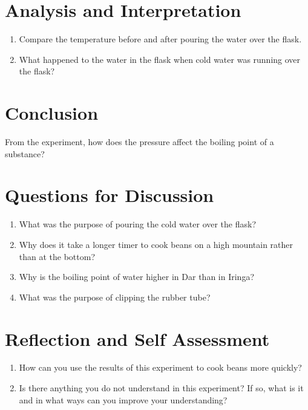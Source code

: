
\section{Analysis and Interpretation}
\begin{enumerate}
\item Compare the temperature before and after pouring the water over the flask.
\item What happened to the water in the flask when cold water was running over the flask?
\end{enumerate}

\section{Conclusion}
From the experiment, how does the pressure affect the boiling point of a substance?

\section{Questions for Discussion}
\begin{enumerate}
\item What was the purpose of pouring the cold water over the flask?
\item Why does it take a longer timer to cook beans on a high mountain rather than at the bottom?
\item Why is the boiling point of water higher in Dar than in Iringa?
\item What was the purpose of clipping the rubber tube?
\end{enumerate}

\section{Reflection and Self Assessment}
\begin{enumerate}
\item How can you use the results of this experiment to cook beans more quickly?
\item Is there anything you do not understand in this experiment? If so, what is it and in what ways can you improve your understanding? 
\end{enumerate}